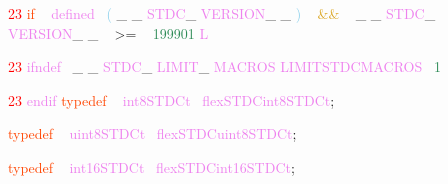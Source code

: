 \documentclass[8, usernames, dvipsnames]{beamer}
\begin{document}
\begin{frame}

  \textcolor{Red}{23}
\textcolor{OrangeRed}{if}
\textcolor{White}{\ }
\textcolor{Violet}{defined}\textcolor{White}{\ }
\textcolor{SkyBlue}{(}
\textcolor{Sepia}{\_}
\textcolor{Sepia}{\_}
\textcolor{Violet}{STDC}\textcolor{Sepia}{\_}
\textcolor{Violet}{VERSION}\textcolor{Sepia}{\_}
\textcolor{Sepia}{\_}
\textcolor{SkyBlue}{)}
\textcolor{White}{\ }
\textcolor{Goldenrod}{ \&\& }
\textcolor{White}{\ }
\textcolor{Sepia}{\_}
\textcolor{Sepia}{\_}
\textcolor{Violet}{STDC}\textcolor{Sepia}{\_}
\textcolor{Violet}{VERSION}\textcolor{Sepia}{\_}
\textcolor{Sepia}{\_}
\textcolor{White}{\ }
\textcolor{OliveGreen}{\textgreater =}
\textcolor{White}{\ }
\textcolor{SeaGreen}{199901}
\textcolor{Violet}{L}
 
 
  \textcolor{Red}{23}
\textcolor{Violet}{ifndef}\textcolor{White}{\ }
\textcolor{Sepia}{\_}
\textcolor{Sepia}{\_}
\textcolor{Violet}{STDC}\textcolor{Sepia}{\_}
\textcolor{Violet}{LIMIT}\textcolor{Sepia}{\_}
\textcolor{Violet}{MACROS}
 \textcolor{Violet}{LIMITSTDCMACROS}\textcolor{White}{\ }
\textcolor{SeaGreen}{1}

  \textcolor{Red}{23}
\textcolor{Violet}{endif}
 \textcolor{OrangeRed}{typedef}
\textcolor{White}{\ }
\textcolor{Violet}{int8STDCt}\textcolor{White}{\ }
\textcolor{Violet}{flexSTDCint8STDCt}\textcolor{Sepia}{;}

 \textcolor{OrangeRed}{typedef}
\textcolor{White}{\ }
\textcolor{Violet}{uint8STDCt}\textcolor{White}{\ }
\textcolor{Violet}{flexSTDCuint8STDCt}\textcolor{Sepia}{;}

 \textcolor{OrangeRed}{typedef}
\textcolor{White}{\ }
\textcolor{Violet}{int16STDCt}\textcolor{White}{\ }
\textcolor{Violet}{flexSTDCint16STDCt}\textcolor{Sepia}{;}

 \end{frame}
\end{document}
